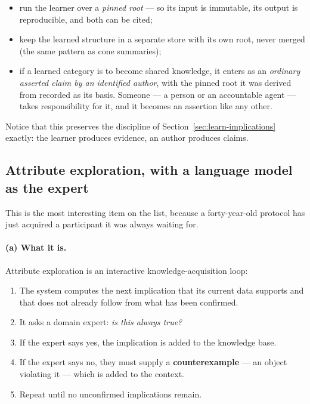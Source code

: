 \begin{itemize}[leftmargin=1.4em]
\item run the learner over a \emph{pinned root} --- so its input is
  immutable, its output is reproducible, and both can be cited;
\item keep the learned structure in a separate store with its own root, never
  merged (the same pattern as cone summaries);
\item if a learned category is to become shared knowledge, it enters as an
  \emph{ordinary asserted claim by an identified author}, with the pinned root
  it was derived from recorded as its basis. Someone --- a person or an
  accountable agent --- takes responsibility for it, and it becomes an
  assertion like any other.
\end{itemize}

Notice that this preserves the discipline of
Section~\ref{sec:learn-implications} exactly: the learner produces evidence,
an author produces claims.

\subsection{Attribute exploration, with a language model as the expert}
\label{sec:learn-exploration}

This is the most interesting item on the list, because a forty-year-old
protocol has just acquired a participant it was always waiting for.

\paragraph{(a) What it is.} Attribute exploration \citep{ganter2016} is an
interactive knowledge-acquisition loop:

\begin{enumerate}[leftmargin=1.7em,itemsep=1pt]
\item The system computes the next implication that its current data supports
  and that does not already follow from what has been confirmed.
\item It asks a domain expert: \emph{is this always true?}
\item If the expert says yes, the implication is added to the knowledge base.
\item If the expert says no, they must supply a \textbf{counterexample} --- an
  object violating it --- which is added to the context.
\item Repeat until no unconfirmed implications remain.
\end{enumerate}

